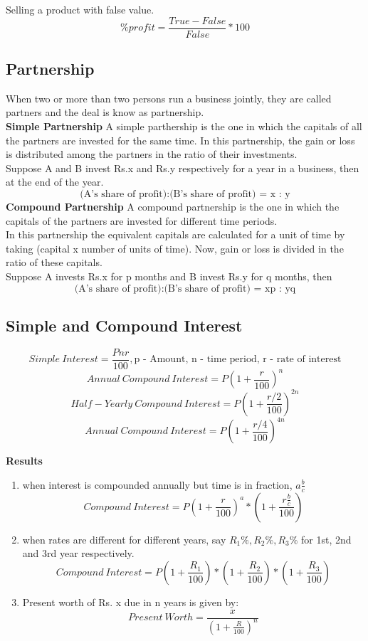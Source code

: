 Selling a product with false value.
\[\%profit= \frac{True - False}{False}*100\]


\subsection{Partnership}
When two or more than two persons run a business jointly, they are called partners and the deal is know as partnership.\vspace{0.2cm}\\
\textbf{Simple Partnership} A simple parthership is the one in which the capitals of all the partners are invested for the same time. In this partnership, the gain or loss is distributed among the partners in the ratio of their investments.\\
Suppose A and B invest Rs.x and Rs.y respectively for a year in a business, then at the end of the year.\\
\[\text{(A's share of profit):(B's share of profit) = x : y}\]
\textbf{Compound Partnership} A compound partnership is the one in which the capitals of the partners are invested for different time periods.\\
In this partnership the equivalent capitals are calculated for a unit of time by taking (capital x number of units of time). Now, gain or loss is divided in the ratio of these capitals.\\
Suppose A invests Rs.x for p months and B invest Rs.y for q months, then
\[\text{(A's share of profit):(B's share of profit) = xp : yq}\]


\subsection{Simple and Compound Interest}
\begin{fleqn}
\[Simple\ Interest=\frac{Pnr}{100}, \text{p - Amount, n - time period, r - rate of interest}\]
\[Annual\ Compound\ Interest=P\left(1+\frac{r}{100} \right)^n\]
\[Half-Yearly\ Compound\ Interest=P\left(1+\frac{r/2}{100} \right)^{2n}\]
\[Annual\ Compound\ Interest=P\left(1+\frac{r/4}{100} \right)^{4n}\]
\end{fleqn}
{\textbf{\large{Results}}}\\
\begin{enumerate}
    \item when interest is compounded annually but time is in fraction, \(a\frac{b}{c}\)
    \[Compound\ Interest=P\left(1+\frac{r}{100} \right)^a*\left(1+\frac{r\frac{b}{c}}{100} \right)\]
    \item when rates are different for different years, say \(R_1\%, R_2\%, R_3\%\) for 1st, 2nd and 3rd year respectively.
    \[Compound\ Interest=P\left(1+\frac{R_1}{100} \right)*\left(1+\frac{R_2}{100} \right)*\left(1+\frac{R_3}{100} \right)\]
    \item Present worth of Rs. x due in n years is given by:
    \[Present\ Worth=\frac{x}{\left(1 + \frac{R}{100}\right)^n}\]
\end{enumerate}


